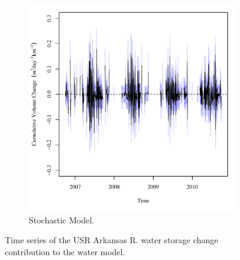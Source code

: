 \begin{linenumbers}
\begin{figure}[htbp]
\begin{subfigure}{0.5\textwidth}
		\includegraphics[width=0.9\linewidth]{"Figures/Results_USR/Balance Water - storage"}
		\caption{Stochastic Model.}
		\label{sub:USRWaterStoreS}
	\end{subfigure}
	\caption[Time series of the USR Arkansas R. water storage change contribution to the water model.]{Time series of the USR Arkansas R. water storage change contribution to the water model.}
	\label{fig:USRWaterStore}
\end{figure}


\end{linenumbers}
